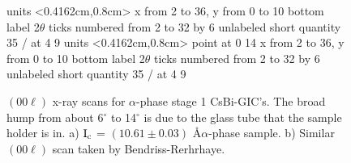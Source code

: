 


\pagestyle{empty}

\begin{figure}
\beginpicture
\setcoordinatesystem units <0.4162cm,0.8cm>
\setplotarea x from 2 to 36, y from 0 to 10
\axis bottom label {2$\theta$} ticks 
	numbered from 2 to 32 by 6
	unlabeled short quantity 35 /
 at 4 9
\setcoordinatesystem units <0.4162cm,0.8cm> point at 0 14
\setplotarea x from 2 to 36, y from 0 to 10
\axis bottom label {2$\theta$} ticks 
	numbered from 2 to 32 by 6
	unlabeled short quantity 35 /
 at 4 9
\endpicture
\caption[$(00\ell)$ x-ray scans for $\alpha$-phase  stage 1 CsBi-GIC's.]{$(00\ell)$ x-ray scans for $\alpha$-phase  stage 1 CsBi-GIC's.  The broad hump
from about 6$^{\circ}$  to 14$^{\circ}$  is due  to the glass tube that the
sample holder is in.  a) $\rm I_c$ = $(10.61  \pm 0.03)$ \AA $\alpha$-phase
sample.        b)    Similar       $(00\ell)$       scan       taken     by
Bendriss-Rerhrhaye\cite{bendriss88}.}
\label{stixr}
\end{figure}

